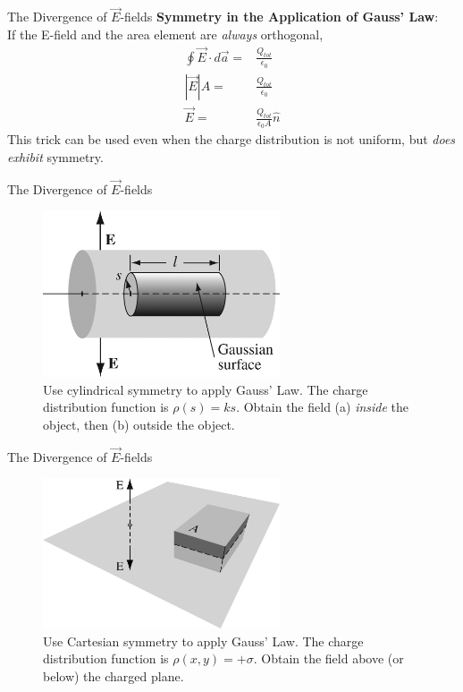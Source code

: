 \documentclass{beamer}
\begin{document}
\begin{frame}{The Divergence of $\vec{E}$-fields}
\textbf{\alert{Symmetry in the Application of Gauss' Law}}: \\
If the E-field and the area element are \textit{always} orthogonal,
\begin{align}
\oint \vec{E} \cdot d\vec{a} =& \frac{Q_{tot}}{\epsilon_0} \\
|\vec{E}| A =& \frac{Q_{tot}}{\epsilon_0} \\
\vec{E} =& \frac{Q_{tot}}{\epsilon_0 A} \hat{n}
\end{align}
This trick can be used even when the charge distribution is not uniform, but \textit{does exhibit} symmetry.
\end{frame}

\begin{frame}{The Divergence of $\vec{E}$-fields}
\begin{figure}
\centering
\includegraphics[width=7cm]{figures/2_21.jpg}
\caption{\label{fig:cyl} Use cylindrical symmetry to apply Gauss' Law.  The charge distribution function is $\rho(s) = ks$.  Obtain the field (a) \textit{inside} the object, then (b) outside the object.}
\end{figure}
\end{frame}

\begin{frame}{The Divergence of $\vec{E}$-fields}
\begin{figure}
\centering
\includegraphics[width=7cm]{figures/2_22.jpg}
\caption{\label{fig:cyl2} Use Cartesian symmetry to apply Gauss' Law.  The charge distribution function is $\rho(x,y) = +\sigma$.  Obtain the field above (or below) the charged plane.}
\end{figure}
\end{frame}
\end{document}
